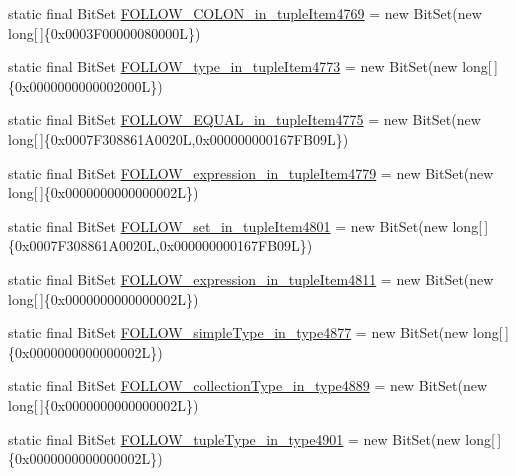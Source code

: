 \begin{DoxyCompactItemize}
\item 
static final Bit\-Set \hyperlink{classorg_1_1tzi_1_1use_1_1parser_1_1soil_1_1_soil_parser_a6a03dd29d886d5e4b71656a186761762}{F\-O\-L\-L\-O\-W\-\_\-\-C\-O\-L\-O\-N\-\_\-in\-\_\-tuple\-Item4769} = new Bit\-Set(new long\mbox{[}$\,$\mbox{]}\{0x0003\-F00000080000\-L\})
\item 
static final Bit\-Set \hyperlink{classorg_1_1tzi_1_1use_1_1parser_1_1soil_1_1_soil_parser_a5782653781d397d60c474480d9ea98ba}{F\-O\-L\-L\-O\-W\-\_\-type\-\_\-in\-\_\-tuple\-Item4773} = new Bit\-Set(new long\mbox{[}$\,$\mbox{]}\{0x0000000000002000\-L\})
\item 
static final Bit\-Set \hyperlink{classorg_1_1tzi_1_1use_1_1parser_1_1soil_1_1_soil_parser_a80f76c3cf9096cb8b06223cee1ba9965}{F\-O\-L\-L\-O\-W\-\_\-\-E\-Q\-U\-A\-L\-\_\-in\-\_\-tuple\-Item4775} = new Bit\-Set(new long\mbox{[}$\,$\mbox{]}\{0x0007\-F308861\-A0020\-L,0x000000000167\-F\-B09\-L\})
\item 
static final Bit\-Set \hyperlink{classorg_1_1tzi_1_1use_1_1parser_1_1soil_1_1_soil_parser_a20c4ae9c8fbf5359a52be5b881f853ec}{F\-O\-L\-L\-O\-W\-\_\-expression\-\_\-in\-\_\-tuple\-Item4779} = new Bit\-Set(new long\mbox{[}$\,$\mbox{]}\{0x0000000000000002\-L\})
\item 
static final Bit\-Set \hyperlink{classorg_1_1tzi_1_1use_1_1parser_1_1soil_1_1_soil_parser_a9ed071c40f074d8d4425a2ed8bcef8e4}{F\-O\-L\-L\-O\-W\-\_\-set\-\_\-in\-\_\-tuple\-Item4801} = new Bit\-Set(new long\mbox{[}$\,$\mbox{]}\{0x0007\-F308861\-A0020\-L,0x000000000167\-F\-B09\-L\})
\item 
static final Bit\-Set \hyperlink{classorg_1_1tzi_1_1use_1_1parser_1_1soil_1_1_soil_parser_a72111a6a4e85976c615a4bdd20129871}{F\-O\-L\-L\-O\-W\-\_\-expression\-\_\-in\-\_\-tuple\-Item4811} = new Bit\-Set(new long\mbox{[}$\,$\mbox{]}\{0x0000000000000002\-L\})
\item 
static final Bit\-Set \hyperlink{classorg_1_1tzi_1_1use_1_1parser_1_1soil_1_1_soil_parser_ab33dd3b730c5d4a1594aa2be4ef56067}{F\-O\-L\-L\-O\-W\-\_\-simple\-Type\-\_\-in\-\_\-type4877} = new Bit\-Set(new long\mbox{[}$\,$\mbox{]}\{0x0000000000000002\-L\})
\item 
static final Bit\-Set \hyperlink{classorg_1_1tzi_1_1use_1_1parser_1_1soil_1_1_soil_parser_a421c6ebe842e2c7c73252b97e073168b}{F\-O\-L\-L\-O\-W\-\_\-collection\-Type\-\_\-in\-\_\-type4889} = new Bit\-Set(new long\mbox{[}$\,$\mbox{]}\{0x0000000000000002\-L\})
\item 
static final Bit\-Set \hyperlink{classorg_1_1tzi_1_1use_1_1parser_1_1soil_1_1_soil_parser_a1503a3faa292c1f194e107c5b9a1b321}{F\-O\-L\-L\-O\-W\-\_\-tuple\-Type\-\_\-in\-\_\-type4901} = new Bit\-Set(new long\mbox{[}$\,$\mbox{]}\{0x0000000000000002\-L\})

\end{DoxyCompactItemize}
